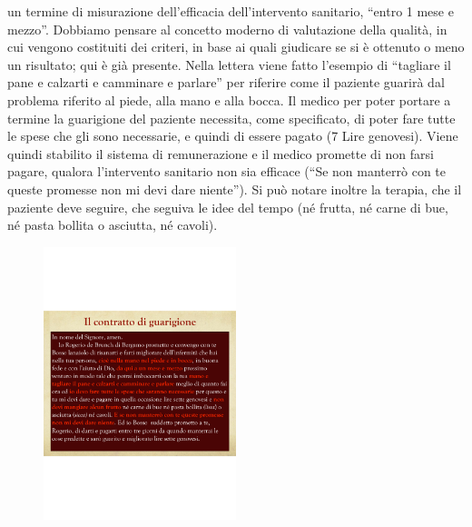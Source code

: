 un termine di misurazione dell'efficacia dell'intervento sanitario,
``entro 1 mese e mezzo''. Dobbiamo pensare al concetto moderno di
valutazione della qualità, in cui vengono costituiti dei criteri, in
base ai quali giudicare se si è ottenuto o meno un risultato; qui è già
presente. Nella lettera viene fatto l'esempio di ``tagliare il pane e
calzarti e camminare e parlare'' per riferire come il paziente guarirà
dal problema riferito al piede, alla mano e alla bocca. Il medico per
poter portare a termine la guarigione del paziente necessita, come
specificato, di poter fare tutte le spese che gli sono necessarie, e
quindi di essere pagato (7 Lire genovesi). Viene quindi stabilito il
sistema di remunerazione e il medico promette di non farsi pagare,
qualora l'intervento sanitario non sia efficace (``Se non manterrò con
te queste promesse non mi devi dare niente''). Si può notare inoltre la
terapia, che il paziente deve seguire, che seguiva le idee del tempo (né
frutta, né carne di bue, né pasta bollita o asciutta, né cavoli).

\begin{figure}[!ht]
\centering
	\includegraphics[width=0.5\textwidth]{38/image1.png}
	\end{figure}

